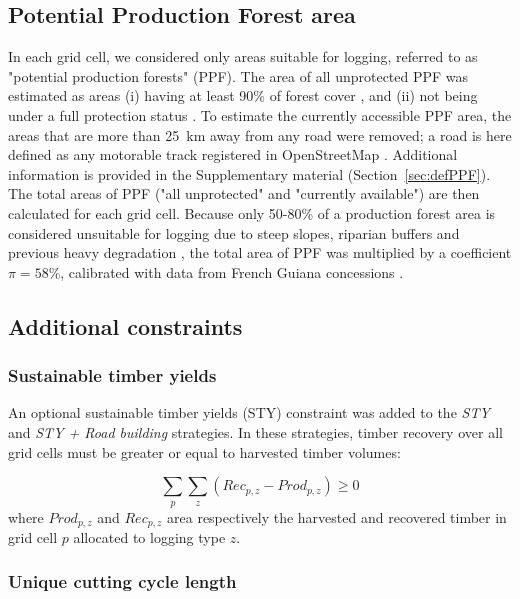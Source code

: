 \documentclass{article}
\begin{document}
\subsection{Potential Production Forest area}
\label{sec:ppf}

In each grid cell, we considered only areas suitable for logging, referred to as "potential production forests" (PPF). The area of all unprotected PPF was estimated as areas (i) having at least 90\% of forest cover \cite{Hansen2013}, and (ii) not being under a full protection status \cite{WDPA2016}. To estimate the currently accessible PPF area, the areas that are more than 25~km away from any road were removed; a road is here defined as any motorable track registered in OpenStreetMap \cite{OSM2018}. Additional information is provided in the Supplementary material (Section~\ref{sec:defPPF}). 
The total areas of PPF ("all unprotected" and "currently available") are then calculated for each grid cell. Because only 50-80\% of a production forest area is considered unsuitable for logging  due to steep slopes, riparian buffers and previous heavy degradation \cite{Feldpausch2006,Verissimo2002}, the total area of PPF was multiplied by a coefficient $\pi = 58\%$, calibrated with data from French Guiana concessions \cite{Piponiot2019}.

\subsection{Additional constraints}

\subsubsection{Sustainable timber yields}

An optional sustainable timber yields (STY) constraint was added to the \textit{STY} and \textit{STY + Road building} strategies. In these strategies, timber recovery over all grid cells must be greater or equal to harvested timber volumes: 

\begin{equation}
    \sum_{p}\sum_{z} (Rec_{p,z} - Prod_{p,z}) \geq 0 
\end{equation}
where $Prod_{p,z}$ and $Rec_{p,z}$ area respectively the harvested and recovered timber in grid cell $p$ allocated to logging type $z$.

\subsubsection{Unique cutting cycle length}
\end{document}
